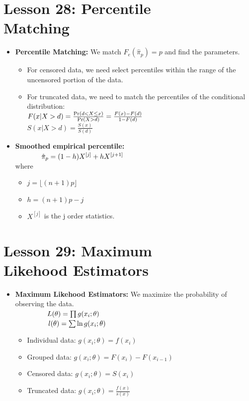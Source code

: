 \documentclass[10pt, french]{article}
\begin{document}
\begin{multicols*}{3}
\section*{Lesson 28: Percentile \\Matching}
\label{Def:empirical percentile}
\begin{itemize}[align=left,leftmargin=*]
\item \textbf{Percentile Matching:} We match $F_e(\hat{\pi}_{p}) = p$ and find the parameters.
\begin{itemize}
    \item For censored data, we need select percentiles within the range of the uncensored portion of the data.
    \item For truncated data, we need to match the percentiles of the conditional distribution:\\
        $F(x|X>d)=\frac{\Pr \left( d<X\leq x \right)}{\Pr \left( X>d \right)}=\frac{F(x)-F(d)}{1- F(d)}$ \\
        $S(x|X>d)=\frac{S(x)}{S(d)}$
\end{itemize}
\item \textbf{Smoothed empirical percentile:} \\ $\hspace*{1.3cm} \hat{\pi}_{p} = (1-h)X^{[j]} + h X^{[j+1]}$ \\ where
\begin{itemize}
    \item $j = \lfloor (n+1)p \rfloor$
    \item $h = (n+1)p - j$
    \item $X^{[j]}$ is the j order statistics.
\end{itemize}
\end{itemize}

\section*{Lesson 29: Maximum \\Likehood Estimators}
\begin{itemize}[align=left,leftmargin=*]
\item \textbf{Maximum Likehood Estimators:} We maximize the probability of observing the data. \\
$\hspace*{1.6cm} L(\theta) = \prod g(x_i;\theta)$ \\
$\hspace*{1.65cm} l(\theta) = \sum \ln g(x_i;\theta)$
\begin{itemize}
    \item Individual data: $g(x_i;\theta) = f(x_i)$
    \item Grouped data: $g(x_i;\theta) = F(x_i) - F(x_{i-1})$
    \item Censored data: $g(x_i;\theta) = S(x_i) $
    \item Truncated data:  $g(x_i;\theta) = \frac{f(x)}{s(x)} $
\end{itemize}
\end{itemize}



\end{multicols*}
\end{document}
